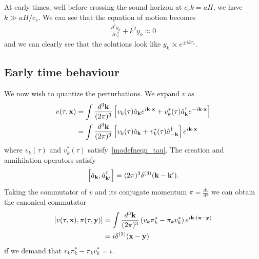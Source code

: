     At early times, well before crossing the sound horizon at $c_sk=aH$,
    we have $k\gg aH/c_s$. We can see that the equation of motion becomes
    \begin{align}
        \frac{\partial^2 y_k}{\partial \tau_s^2} + k^2 y_k \approx 0
    \end{align}
    and we can clearly see that the solutions look like $y_k\propto e^{\pm ik\tau_s}$.


    \subsection{Early time behaviour}
    We now wish to quantize the perturbations. We expand $v$ as
    \begin{align}\label{operator_expansion}
        v(\tau,\mathbf{x}) &= \int\frac{d^3\mathbf{k}}{(2\pi)^3}\left[
            v_k(\tau)\hat{a}_{\mathbf{k}} e^{i\mathbf{k}\cdot\mathbf{x}}+
            v^*_k(\tau)\hat{a}^{\dagger}_{\mathbf{k}} e^{-i\mathbf{k}\cdot\mathbf{x}}
        \right]\\
            &= \int\frac{d^3\mathbf{k}}{(2\pi)^3}\left[
            v_k(\tau)\hat{a}_{\mathbf{k}} +
            v^*_k(\tau)\hat{a}^{\dagger}_{-\mathbf{k}}
        \right]e^{i\mathbf{k}\cdot\mathbf{x}}
    \end{align}
    where $v_k(\tau)$ and $v^*_k(\tau)$ satisfy~\eqref{modefneqn_tau}.
    The creation and annihilation operators satisfy
    \begin{align}\label{creation_annihilation_commutator}
        \left[\hat{a}_{\mathbf{k}},\hat{a}^{\dagger}_{\mathbf{k}'}\right] = (2\pi)^3\delta^{(3)}(\mathbf{k}-\mathbf{k}').
    \end{align}
    Taking the commutator of $v$ and its conjugate momentum $\pi=\frac{dv}{d\tau}$
    we can obtain the canonical commutator
    \begin{align}
        \left[v(\tau,\mathbf{x}),\pi(\tau,\mathbf{y})\right] &=
        \int \frac{d^3 \mathbf{k}}{(2\pi)^3}\left(v_k\pi^*_k-\pi_kv^*_k\right)e^{i\mathbf{k}\cdot(\mathbf{x}-\mathbf{y})}\\
        &= i \delta^{(3)}(\mathbf{x}-\mathbf{y})
    \end{align}
    if we demand that $v_k\pi^*_k-\pi_kv^*_k=i$.
